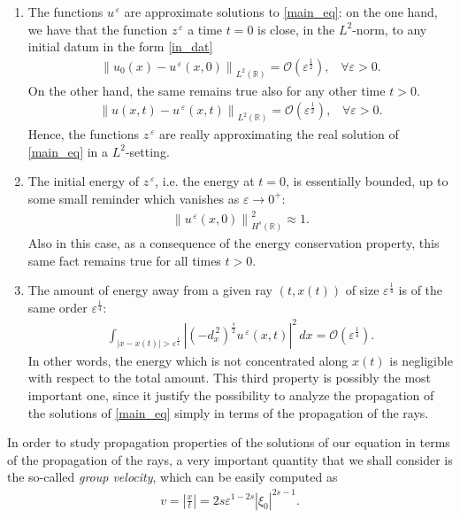 \documentclass[10pt]{article}
\newcommand{\norm}[2]{{\left\|#1\right\|}_{#2}}
\newcommand{\ffl}[2]{(-d_x^{\,2})^{#1}#2}
\newcommand{\ue}[1]{#1^{\,\varepsilon}}
\newcommand{\RR}{\mathbb{R}}
\begin{document}
\begin{enumerate}
	\item The functions $\ue{u}$ are approximate solutions to \eqref{main_eq}: on the one hand, we have that the function $\ue{z}$ a time $t=0$ is close, in the $L^2$-norm, to any initial datum in the form \eqref{in_dat}
	\begin{align*}
		\norm{u_0(x)-\ue{u}(x,0)}{L^2(\RR)} = \mathcal{O}(\varepsilon^{\frac{1}{2}}),\;\;\;\forall\varepsilon>0.
	\end{align*}
	On the other hand, the same remains true also for any other time $t>0$.
	\begin{align*}
		\norm{u(x,t)-\ue{u}(x,t)}{L^2(\RR)} = \mathcal{O}(\varepsilon^{\frac 12}),\;\;\;\forall\varepsilon>0.
	\end{align*}
	Hence, the functions $\ue{z}$ are really approximating the real solution of \eqref{main_eq} in a $L^2$-setting.
	\item The initial energy of $\ue{z}$, i.e. the energy at $t=0$, is essentially bounded, up to some small reminder which vanishes as $\varepsilon\to 0^+$: 
	\begin{align*}
		\norm{\ue{u}(x,0)}{H^s(\RR)}^2 \approx 1.
	\end{align*}
	Also in this case, as a consequence of the energy conservation property, this same fact remains true for all times $t>0$. 
	\item The amount of energy away from a given ray $(t,x(t))$ of size $\varepsilon^{\frac 14}$ is of the same order $\varepsilon^{\frac 14}$:
	\begin{align*}
		\int_{|x-x(t)|>\varepsilon^{\frac 14}} \left|\ffl{\frac s2}{\ue{u}}(x,t)\right|^2\,dx = \mathcal O(\varepsilon^{\frac 14}).
	\end{align*}	
	In other words, the energy which is not concentrated along $x(t)$ is negligible with respect to the total amount. This third property is possibly the most important one, since it justify the possibility to analyze the propagation of the solutions of \eqref{main_eq} simply in terms of the propagation of the rays. 
\end{enumerate}

In order to study propagation properties of the solutions of our equation in terms of the propagation of the rays, a very important quantity that we shall consider is the so-called \textit{group velocity}, which can be easily computed as 
\begin{align*}
	v=\left|\frac xt\right| = 2s\varepsilon^{1-2s}|\xi_0|^{2s-1}.
\end{align*}
\end{document}
